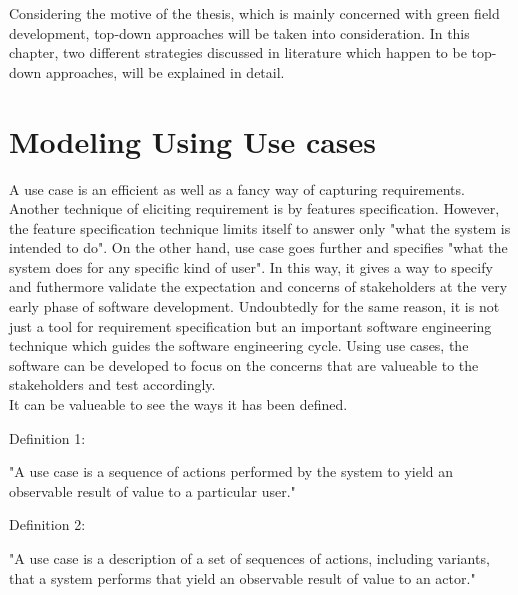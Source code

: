 Considering the motive of the thesis, which is mainly concerned with green field development, top-down approaches will be taken into consideration. In this chapter, two different strategies discussed in literature which happen to be top-down approaches, will be explained in detail.

\section{Modeling Using Use cases}\label{section:selection_by_use_case/use_case}
A use case is an efficient as well as a fancy way of capturing requirements. Another technique of eliciting requirement is by features specification. However, the feature specification technique limits itself to answer only "what the system is intended to do". On the other hand, use case goes further and specifies "what the system does for any specific kind of user". In this way, it gives a way to specify and futhermore validate the expectation and concerns of stakeholders at the very early phase of software development. Undoubtedly for the same reason, it is not just a tool for requirement specification but an important software engineering technique which guides the software engineering cycle. Using use cases, the software can be developed to focus on the concerns that are valueable to the stakeholders and test accordingly.\cite{Ng:2004aa}
\\
It can be valueable to see the ways it has been defined.
\begin{shaded}Definition 1: \cite{Jacobson:1987aa} \end{shaded}
"A use case is a sequence of actions performed by the system to yield an observable result of value to a particular user." 
\\
\begin{shaded}Definition 2: \cite{Rumbaugh:1999aa}\end{shaded}
"A use case is a description of a set of sequences of actions, including variants, that a system performs that yield an observable result of value to an actor."


